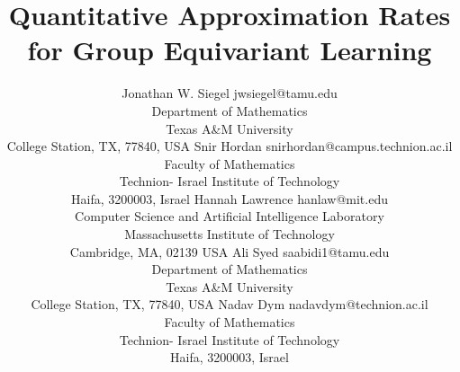 \documentclass[twoside,11pt]{article}
\begin{document}
\title{Quantitative Approximation Rates for Group Equivariant Learning}

\author{\name Jonathan W. Siegel \email jwsiegel@tamu.edu\\
\addr Department of Mathematics \\
      Texas A\&M University\\
      College Station, TX, 77840, USA 
       \AND
        \name Snir Hordan \email snirhordan@campus.technion.ac.il \\
       \addr Faculty of Mathematics\\
      Technion- Israel Institute of Technology\\
      Haifa, 3200003,  Israel
      \AND
      \name Hannah Lawrence \email hanlaw@mit.edu\\
      \addr Computer Science and Artificial Intelligence Laboratory \\
      Massachusetts Institute of Technology\\
      Cambridge, MA, 02139 USA
      \AND 
      \name Ali Syed  \email saabidi1@tamu.edu\\ \addr Department of Mathematics \\
      Texas A\&M University\\
      College Station, TX, 77840, USA  
      \AND 
      \name Nadav Dym \email nadavdym@technion.ac.il \\
       \addr Faculty of Mathematics\\
      Technion- Israel Institute of Technology\\
      Haifa, 3200003, Israel
      }



\maketitle
\end{document}
